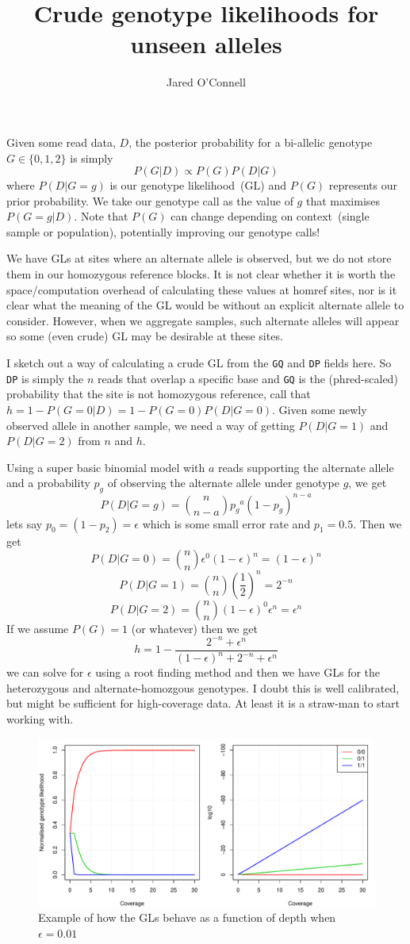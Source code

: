 \documentclass{article}  %
\title{Crude genotype likelihoods for unseen alleles}
\author{Jared O'Connell}
\begin{document}
\maketitle
Given some read data, $D$, the posterior probability for a bi-allelic genotype $G\in\{0,1,2\}$ is simply
$$P(G|D) \propto P(G)P(D|G)$$
where $P(D|G=g)$ is our genotype likelihood~(GL) and $P(G)$ represents our prior
probability. We take our genotype call as the value of $g$ that
maximises $P(G=g|D)$. Note that $P(G)$ can change depending on
context~(single sample or population), potentially improving our
genotype calls!

We have GLs at sites where an alternate allele is observed, but we do
not store them in our homozygous reference blocks. It is not clear
whether it is worth the space/computation overhead of calculating
these values at homref sites, nor is it clear what the meaning of the
GL would be without an explicit alternate allele to consider.
However, when we aggregate samples, such alternate alleles will appear
so some (even crude) GL may be desirable at these sites.

I sketch out a way of calculating a crude GL from the \texttt{GQ} and \texttt{DP} fields here. So \texttt{DP} is simply the $n$ reads that overlap a specific base and \texttt{GQ} is the (phred-scaled) probability that the site is not homozygous reference, call that $h=1-P(G=0|D)=1-P(G=0)P(D|G=0)$. Given some newly observed allele in another sample, we need a way of getting $P(D|G=1)$ and $P(D|G=2)$ from $n$ and $h$.

Using a super basic binomial model with $a$ reads supporting the
alternate allele and a probability $p_g$ of  observing the alternate
allele under genotype $g$, we get
$$P(D|G=g) = {{n}\choose{n-a}}{p_g}^{a}(1-p_g)^{n-a}$$
lets say $p_0=(1-p_2)=\epsilon$ which is some small error rate and $p_1 = 0.5$. Then we get
$$P(D|G=0) = {{n}\choose{n}}\epsilon^0(1-\epsilon)^n=(1-\epsilon)^n$$
$$P(D|G=1) = {{n}\choose{n}}(\frac{1}{2})^n=2^{-n}$$
$$P(D|G=2) = {{n}\choose{n}}(1-\epsilon)^0\epsilon^n=\epsilon^n$$
If we assume $P(G)=1$ (or whatever) then we get
$$h = 1 - \frac{2^{-n} + \epsilon^n}{(1-\epsilon)^n+ 2^{-n} +\epsilon^n }$$
we can solve for $\epsilon$ using a root finding method and then we have GLs for the heterozygous and alternate-homozgous genotypes. I doubt this is well calibrated, but might be sufficient for high-coverage data. At least it is a straw-man to start working with.

\begin{figure}
  \begin{center} \includegraphics[width=\textwidth]{figure1}
    \caption{Example of how the GLs behave as a function of depth when $\epsilon=0.01$}
  \end{center}
\end{figure}
\end{document}
